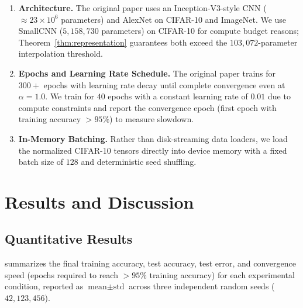 \documentclass[12pt,a4paper]{article}
\newif\ifshowguides
\newcommand{\guide}[1]{%
  \ifshowguides
    \begin{tcolorbox}[colframe=blue!60,colback=blue!5,
                      title={\small\textbf{Instructor Guide}},
                      fonttitle=\small\bfseries]
      {\small\textit{Guide: }#1}
    \end{tcolorbox}
  \fi
}
\theoremstyle{definition}
\theoremstyle{remark}
\begin{document}
\begin{enumerate}
  \item \textbf{Architecture.} The original paper uses an Inception-V3-style
        CNN ($\approx 23 \times 10^6$ parameters) and AlexNet on CIFAR-10 and
        ImageNet. We use SmallCNN ($5{,}158{,}730$ parameters) on CIFAR-10 for
        compute budget reasons; Theorem~\ref{thm:representation} guarantees both
        exceed the $103{,}072$-parameter interpolation threshold.
  \item \textbf{Epochs and Learning Rate Schedule.} The original paper trains
        for $300+$ epochs with learning rate decay until complete convergence even
        at $\alpha = 1.0$. We train for $40$ epochs with a constant learning rate
        of $0.01$ due to compute constraints and report the convergence epoch
        (first epoch with training accuracy $> 95\%$) to measure slowdown.
  \item \textbf{In-Memory Batching.} Rather than disk-streaming data loaders,
        we load the normalized CIFAR-10 tensors directly into device memory with
        a fixed batch size of $128$ and deterministic seed shuffling.
\end{enumerate}

\section{Results and Discussion}
\label{sec:results}

\guide{%
  Present results as tables and figures. Every number in a table should
  be discussed in the text. Connect empirical observations back to
  Theorem~\ref{thm:representation} and to the claims in the original paper.
  State whether your reproduction confirms or contradicts the original
  findings and by how much.
}

\subsection{Quantitative Results}

 summarizes the final training accuracy, test accuracy, test error, and convergence speed (epochs required to reach $>95\%$ training accuracy) for each experimental condition, reported as $\text{mean} \pm \text{std}$ across three independent random seeds ($42, 123, 456$).
\end{document}
